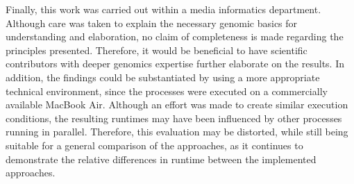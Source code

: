 Finally, this work was carried out within a media informatics department. Although care was taken to explain the necessary genomic basics for understanding and elaboration, no claim of completeness is made regarding the principles presented. Therefore, it would be beneficial to have scientific contributors with deeper genomics expertise further elaborate on the results. In addition, the findings could be substantiated by using a more appropriate technical environment, since the processes were executed on a commercially available MacBook Air. Although an effort was made to create similar execution conditions, the resulting runtimes may have been influenced by other processes running in parallel. Therefore, this evaluation may be distorted, while still being suitable for a general comparison of the approaches, as it continues to demonstrate the relative differences in runtime between the implemented approaches.
